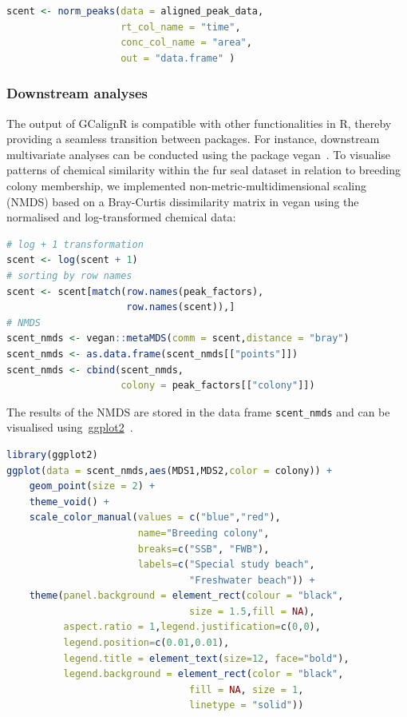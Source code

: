 \documentclass[10pt,letterpaper]{article}
\begin{document}
\begin{lstlisting}[language=R]
scent <- norm_peaks(data = aligned_peak_data,
                    rt_col_name = "time",
                    conc_col_name = "area",
                    out = "data.frame" ) 
\end{lstlisting}

\subsubsection*{Downstream analyses}
The output of GCalignR is compatible with other functionalities in R, thereby providing a seamless transition between packages. For instance, downstream multivariate analyses can be conducted using the package vegan~\cite{Oksanen.2016}. To visualise patterns of chemical similarity within the fur seal dataset in relation to breeding colony membership, we implemented non-metric-multidimensional scaling (NMDS) based on a Bray-Curtis dissimilarity matrix in vegan using the normalised and log-transformed chemical data:

\begin{lstlisting}[language=R]
# log + 1 transformation
scent <- log(scent + 1) 
# sorting by row names
scent <- scent[match(row.names(peak_factors),
                     row.names(scent)),] 
# NMDS
scent_nmds <- vegan::metaMDS(comm = scent,distance = "bray") 
scent_nmds <- as.data.frame(scent_nmds[["points"]]) 
scent_nmds <- cbind(scent_nmds,
                    colony = peak_factors[["colony"]]) 
\end{lstlisting}

The results of the NMDS are stored in the data frame \texttt{scent\_nmds} and can be visualised using~\href{https://CRAN.R-project.org/package=ggplot2}{ggplot2}~\cite{Wickham.2009}.

\begin{lstlisting}[language=R]
library(ggplot2) 
ggplot(data = scent_nmds,aes(MDS1,MDS2,color = colony)) +
    geom_point(size = 2) + 
    theme_void() + 
    scale_color_manual(values = c("blue","red"), 
                       name="Breeding colony",
                       breaks=c("SSB", "FWB"),
                       labels=c("Special study beach", 
                                "Freshwater beach")) +
    theme(panel.background = element_rect(colour = "black",
                                size = 1.5,fill = NA),
          aspect.ratio = 1,legend.justification=c(0,0), 
          legend.position=c(0.01,0.01),
          legend.title = element_text(size=12, face="bold"),
          legend.background = element_rect(color = "black",
                                fill = NA, size = 1, 
                                linetype = "solid")) 
\end{lstlisting}
\end{document}
